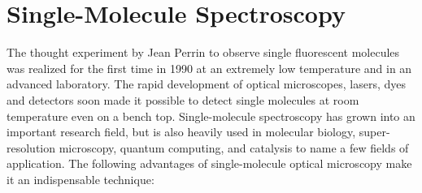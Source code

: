 \section{Single-Molecule Spectroscopy}
The thought experiment by Jean Perrin to observe single fluorescent molecules was realized for the first time in 1990 at an extremely low temperature and in an advanced laboratory.\cite{orrit1990single}
The rapid development of optical microscopes, lasers, dyes and detectors soon made it possible to detect single molecules at room temperature even on a bench top.\cite{xie1998optical,weiss1999fluorescence,moerner1999illuminating}
Single-molecule spectroscopy has grown into an important research field, but is also heavily used in molecular biology, super-resolution microscopy, quantum computing, and catalysis to name a few fields of application.\cite{zhuang2000a,huang2008threedimensional,eisaman2011invited,lounis2005singlephoton,roeffaers2007singlemolecule}
The following advantages of single-molecule optical microscopy make it an indispensable technique:

